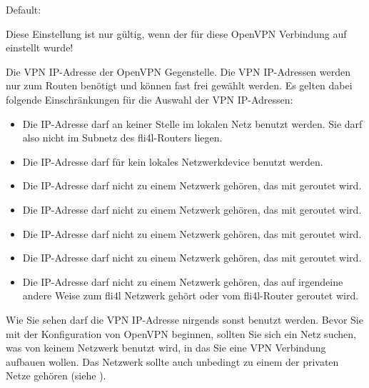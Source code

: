 \begin{description}


  Default: 

  Diese Einstellung ist nur gültig, wenn der
   für diese OpenVPN Verbindung
  auf  einstellt wurde!

  Die VPN IP-Adresse der OpenVPN Gegenstelle. Die VPN IP-Adressen
  werden nur zum Routen benötigt und können fast frei gewählt
  werden. Es gelten dabei folgende Einschränkungen für die Auswahl der
  VPN IP-Adressen:

\begin{itemize}

\item Die IP-Adresse darf an keiner Stelle im lokalen Netz benutzt werden. Sie darf also nicht im Subnetz des fli4l-Routers liegen.

\item Die IP-Adresse darf für kein lokales Netzwerkdevice benutzt werden.

\item Die IP-Adresse darf nicht zu einem Netzwerk gehören, das mit  geroutet wird.

\item Die IP-Adresse darf nicht zu einem Netzwerk gehören, das mit  geroutet wird.

\item Die IP-Adresse darf nicht zu einem Netzwerk gehören, das mit  geroutet wird.

\item Die IP-Adresse darf nicht zu einem Netzwerk gehören, das mit  geroutet wird.

\item Die IP-Adresse darf nicht zu einem Netzwerk gehören, das auf irgendeine andere Weise zum fli4l Netzwerk gehört oder vom fli4l-Router geroutet wird.

\end{itemize}

  Wie Sie sehen darf die VPN IP-Adresse nirgends sonst benutzt
  werden. Bevor Sie mit der Konfiguration von OpenVPN beginnen,
  sollten Sie sich ein Netz suchen, was von keinem Netzwerk benutzt
  wird, in das Sie eine VPN Verbindung aufbauen wollen. Das Netzwerk
  sollte auch unbedingt zu einem der privaten Netze gehören (siehe
  ).


\end{description}
